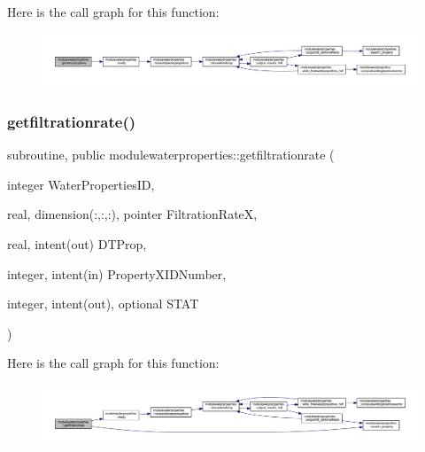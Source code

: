 Here is the call graph for this function\+:\nopagebreak
\begin{figure}[H]
\begin{center}
\leavevmode
\includegraphics[width=350pt]{namespacemodulewaterproperties_ac9026fc793014229d0d9bed57148db6a_cgraph}
\end{center}
\end{figure}
\mbox{\label{namespacemodulewaterproperties_a66ca6cd5369fd51e843c91e5992b9050}} 
\subsubsection{\texorpdfstring{getfiltrationrate()}{getfiltrationrate()}}
{\footnotesize\ttfamily subroutine, public modulewaterproperties\+::getfiltrationrate (\begin{DoxyParamCaption}\item[{integer}]{Water\+Properties\+ID,  }\item[{real, dimension(\+:,\+:,\+:), pointer}]{Filtration\+RateX,  }\item[{real, intent(out)}]{D\+T\+Prop,  }\item[{integer, intent(in)}]{Property\+X\+I\+D\+Number,  }\item[{integer, intent(out), optional}]{S\+T\+AT }\end{DoxyParamCaption})}

Here is the call graph for this function\+:\nopagebreak
\begin{figure}[H]
\begin{center}
\leavevmode
\includegraphics[width=350pt]{namespacemodulewaterproperties_a66ca6cd5369fd51e843c91e5992b9050_cgraph}
\end{center}
\end{figure}
\mbox{\label{namespacemodulewaterproperties_a786f352ede780fcaec30c57d6653f0f1}} 
